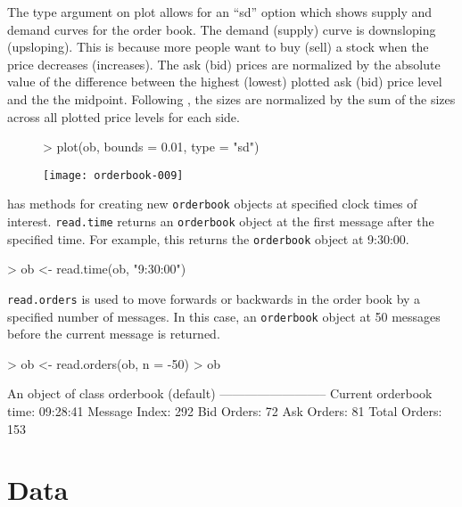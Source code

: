\documentclass[a4paper]{report}
\begin{document}
\begin{article}
The type argument on plot allows for an ``sd'' option which shows
supply and demand curves for the order book. The demand (supply) curve
is downsloping (upsloping). This is because more people want to buy
(sell) a stock when the price decreases (increases). The ask (bid)
prices are normalized by the absolute value of the difference between
the highest (lowest) plotted ask (bid) price level and the the
midpoint. Following \cite{cao:orderbook}, the sizes are normalized by
the sum of the sizes across all plotted price levels for each
side.

\begin{figure}
  \centering
  \vspace*{.1in}
\begin{Schunk}
\begin{Sinput}
> plot(ob, bounds = 0.01, type = "sd")
\end{Sinput}
\end{Schunk}
\texttt{[image: orderbook-009]}
\end{figure}

 has methods for creating new \texttt{orderbook}
objects at specified clock times of interest. \texttt{read.time}
returns an \texttt{orderbook} object at the first message after the
specified time. For example, this returns the \texttt{orderbook}
object at 9:30:00.


\begin{Schunk}
\begin{Sinput}
> ob <- read.time(ob, "9:30:00")
\end{Sinput}
\end{Schunk}

\texttt{read.orders} is used to move forwards or backwards in the
order book by a specified number of messages. In this case, an
\texttt{orderbook} object at 50 messages before the current message is
returned.

\begin{Schunk}
\begin{Sinput}
> ob <- read.orders(ob, n = -50)
> ob
\end{Sinput}
\begin{Soutput}
An object of class orderbook (default)
--------------------------
Current orderbook time:    09:28:41 
Message Index:             292 
Bid Orders:                72 
Ask Orders:                81 
Total Orders:              153 
\end{Soutput}
\end{Schunk}

\section{Data}


\end{article}
\end{document}
